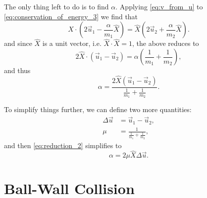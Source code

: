 \documentclass{article}
\begin{document}
The only thing left to do is to find $\alpha$. Applying \autoref{eq:v_from_u} to \autoref{eq:conservation_of_energy_3} we find that
\begin{equation}
    \hat{X}\cdot\left(2\vec{u}_{1}-\frac{\alpha}{m_{1}}\hat{X}\right) = \hat{X}\left(2\vec{u}_{2}+\frac{\alpha}{m_{2}}\hat{X}\right).
    \label{eq:find_alpha}
\end{equation}
and since $\hat{X}$ is a unit vector, i.e. $\hat{X}\cdot\hat{X}=1$, the above reduces to
\begin{equation}
2\hat{X}\cdot\left(\vec{u}_{1}-\vec{u}_{2}\right) = \alpha\left(\frac{1}{m_{1}}+\frac{1}{m_{2}}\right),
    \label{eq:reduction_1}
\end{equation}
and thus
\begin{equation}
\alpha = \frac{2\hat{X}\left(\vec{u}_{1}-\vec{u}_{2}\right)}{\frac{1}{m_{1}}+\frac{1}{m_{2}}}.
    \label{eq:reduction_2}
\end{equation}

To simplify things further, we can define two more quantities:
\begin{align}
    \Delta \vec{u} &= \vec{u}_{1}-\vec{u}_{2},\\
    \mu &= \frac{1}{\frac{1}{m_{1}}+\frac{1}{m_{2}}},
    \label{eq:simplifications_1}
\end{align}
and then \autoref{eq:reduction_2} simplifies to
\begin{equation}
    \alpha = 2\mu\hat{X}\Delta\vec{u}.
    \label{eq:simplifications_2}
\end{equation}

\section{Ball-Wall Collision}
\end{document}
